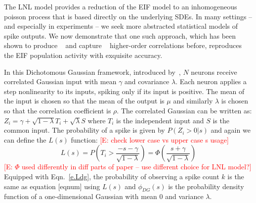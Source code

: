 \documentclass[%
 reprint,
 twocolumn,
 amsmath,amssymb,
 aps,
floatfix,
]{revtex4}
\newcommand{\Ecomment}[1]{\textcolor{red}{[E: #1]}}
\begin{document}
The LNL model provides a reduction of the EIF model to an inhomogeneous poisson process that is based directly on the underlying SDEs.  In many settings -- and especially in experiments -- we seek more abstracted statistical models of spike outputs.  We now demonstrate that one such approach, which has been shown to produce ~\cite{Amari,Macke} and capture ~\cite{Yu} higher-order correlations before, reproduces the EIF population activity with exquisite accuracy.  

In this Dichotomous Gaussian framework, introduced by~\cite{Amari,Macke}, $N$ neurons receive correlated Gaussian input with mean $\gamma$ and covariance $\lambda$. Each neuron applies a step nonlinearity to its inputs, spiking only if its input is positive. The mean of the input is chosen so that the mean of the output is $\mu$ and similarly $\lambda$ is chosen so that the correlation coefficient is $\rho$.
The correlated Gaussian can be written as: $Z_i = \gamma + \sqrt{1-\lambda} T_i + \sqrt{\lambda} S$ where $T_i$ is the independent input and $S$ is the common input. The probability of a spike is given by $P(Z_i > 0 | s)$ and again we can define the $L(s)$ function:  \Ecomment{check lower case vs upper case s usage}
\begin{equation}
L(s) = P\left( T_i > \frac{-s-\gamma}{\sqrt{1-\lambda}} \right) = \Phi\left(\frac{s+\gamma}{\sqrt{1-\lambda}}\right)
\label{e.Ldg}
\end{equation}
\Ecomment{$\Phi$ used differently in diff parts of paper -- use different choice for LNL model?}
Equipped with Eqn.~\eqref{e.Ldg}, the probability of observing a spike count $k$ is the same as equation [eqnum] using $L(s)$ and $\phi_{DG}(s)$ is the probability density function of a one-dimensional Gaussian with mean $0$ and variance $\lambda$.
\end{document}
